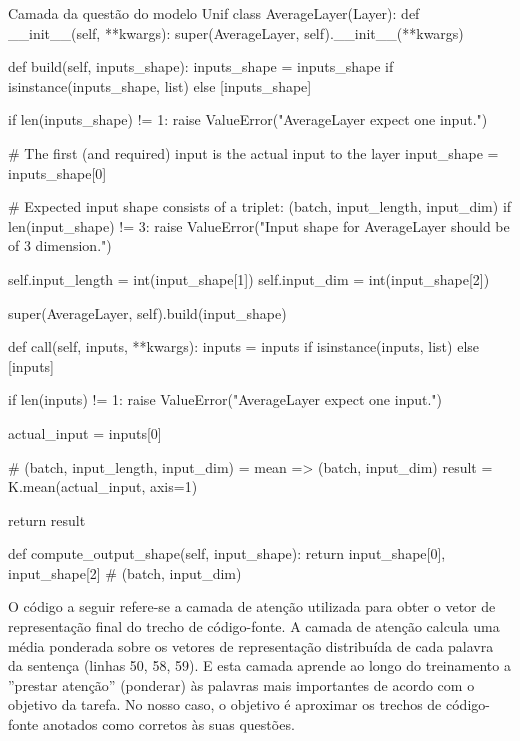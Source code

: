\begin{mypython-linenumber}{Camada da questão do modelo Unif}
class AverageLayer(Layer):
    def __init__(self, **kwargs):
        super(AverageLayer, self).__init__(**kwargs)

    def build(self, inputs_shape):
        inputs_shape = inputs_shape if isinstance(inputs_shape, list) else [inputs_shape]

        if len(inputs_shape) != 1:
            raise ValueError("AverageLayer expect one input.")

        # The first (and required) input is the actual input to the layer
        input_shape = inputs_shape[0]

        # Expected input shape consists of a triplet: (batch, input_length, input_dim)
        if len(input_shape) != 3:
            raise ValueError("Input shape for AverageLayer should be of 3 dimension.")

        self.input_length = int(input_shape[1])
        self.input_dim = int(input_shape[2])

        super(AverageLayer, self).build(input_shape)

    def call(self, inputs, **kwargs):
        inputs = inputs if isinstance(inputs, list) else [inputs]

        if len(inputs) != 1:
            raise ValueError("AverageLayer expect one input.")

        actual_input = inputs[0]

        # (batch, input_length, input_dim) = mean => (batch, input_dim)
        result = K.mean(actual_input, axis=1)

        return result

    def compute_output_shape(self, input_shape):
        return input_shape[0], input_shape[2] # (batch, input_dim)
\end{mypython-linenumber}

\vspace{2cm}

O código a seguir refere-se a camada de atenção utilizada para obter o vetor de representação final do trecho de código-fonte. A camada de atenção calcula uma média ponderada sobre os vetores de representação distribuída de cada palavra da sentença (linhas 50, 58, 59). E esta camada aprende ao longo do treinamento a ''prestar atenção'' (ponderar) às palavras mais importantes de acordo com o objetivo da tarefa. No nosso caso, o objetivo é aproximar os trechos de código-fonte anotados como corretos às suas questões.

